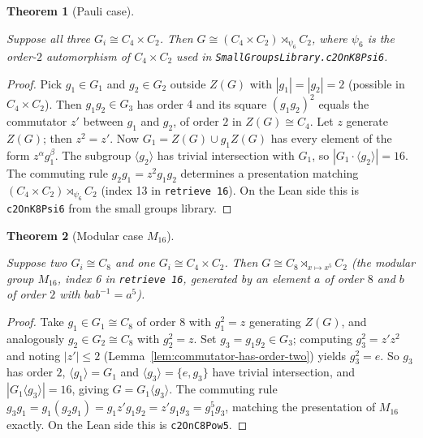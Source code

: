 \documentclass{article}
\newtheorem{theorem}{Theorem}[section]
\theoremstyle{definition}
\newcommand{\uses}[1]{}
\begin{document}
\begin{theorem}[Pauli case]
    \label{thm:case-pauli}
    \uses{lem:subgroup-product-card,lem:commutator-has-order-two}
    Suppose all three $G_i \cong C_4 \times C_2$. Then $G \cong (C_4
    \times C_2) \rtimes_{\psi_6} C_2$, where $\psi_6$ is the order-$2$
    automorphism of $C_4 \times C_2$ used in
    \texttt{SmallGroupsLibrary.c2OnK8Psi6}.
\end{theorem}
\begin{proof}
    \uses{lem:subgroup-product-card,lem:commutator-has-order-two}
    Pick $g_1 \in G_1$ and $g_2 \in G_2$ outside $Z(G)$ with
    $|g_1| = |g_2| = 2$ (possible in $C_4 \times C_2$). Then $g_1 g_2 \in
    G_3$ has order $4$ and its square $(g_1 g_2)^2$ equals the commutator
    $z'$ between $g_1$ and $g_2$, of order $2$ in $Z(G) \cong C_4$. Let
    $z$ generate $Z(G)$; then $z^2 = z'$. Now $G_1 = Z(G) \cup g_1 Z(G)$
    has every element of the form $z^\alpha g_1^\beta$. The subgroup
    $\langle g_2 \rangle$ has trivial intersection with $G_1$, so
    $|G_1 \cdot \langle g_2 \rangle| = 16$. The commuting rule
    $g_2 g_1 = z^2 g_1 g_2$ determines a presentation matching
    $(C_4 \times C_2) \rtimes_{\psi_6} C_2$ (index 13 in
    \texttt{retrieve 16}). On the Lean side this is
    \texttt{c2OnK8Psi6} from the small groups library.
\end{proof}

\begin{theorem}[Modular case $M_{16}$]
    \label{thm:case-modular}
    \uses{lem:subgroup-product-card,lem:commutator-has-order-two}
    Suppose two $G_i \cong C_8$ and one $G_i \cong C_4 \times C_2$. Then
    $G \cong C_8 \rtimes_{x \mapsto x^5} C_2$ (the modular group $M_{16}$,
    index 6 in \texttt{retrieve 16}, generated by an element $a$ of order
    $8$ and $b$ of order $2$ with $bab^{-1} = a^5$).
\end{theorem}
\begin{proof}
    \uses{lem:subgroup-product-card,lem:commutator-has-order-two}
    Take $g_1 \in G_1 \cong C_8$ of order $8$ with $g_1^2 = z$ generating
    $Z(G)$, and analogously $g_2 \in G_2 \cong C_8$ with $g_2^2 = z$. Set
    $g_3 = g_1 g_2 \in G_3$; computing $g_3^2 = z' z^2$ and noting
    $|z'| \le 2$ (Lemma~\ref{lem:commutator-has-order-two}) yields
    $g_3^2 = e$. So $g_3$ has order $2$, $\langle g_1 \rangle = G_1$ and
    $\langle g_3 \rangle = \{e, g_3\}$ have trivial intersection, and
    $|G_1 \langle g_3 \rangle| = 16$, giving $G = G_1 \langle g_3\rangle$.
    The commuting rule
    $g_3 g_1 = g_1 (g_2 g_1) = g_1 z' g_1 g_2 = z' g_1 g_3 = g_1^5 g_3$,
    matching the presentation of $M_{16}$ exactly. On the Lean side this is
    \texttt{c2OnC8Pow5}.
\end{proof}
\end{document}
